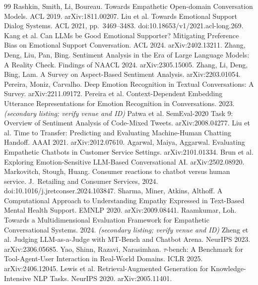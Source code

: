 \documentclass[11pt,a4paper]{article}
\begin{document}
\begin{thebibliography}{99}\small
{} Rashkin, Smith, Li, Boureau. Towards Empathetic Open-domain Conversation Models. ACL 2019. arXiv:1811.00207.
 Liu et al. Towards Emotional Support Dialog Systems. ACL 2021, pp.\ 3469--3483. doi:10.18653/v1/2021.acl-long.269.
 Kang et al. Can LLMs be Good Emotional Supporter? Mitigating Preference Bias on Emotional Support Conversation. ACL 2024. arXiv:2402.13211.
 Zhang, Deng, Liu, Pan, Bing. Sentiment Analysis in the Era of Large Language Models: A Reality Check. Findings of NAACL 2024. arXiv:2305.15005.
 Zhang, Li, Deng, Bing, Lam. A Survey on Aspect-Based Sentiment Analysis. arXiv:2203.01054.
 Pereira, Moniz, Carvalho. Deep Emotion Recognition in Textual Conversations: A Survey. arXiv:2211.09172.
 Pereira et al. Context-Dependent Embedding Utterance Representations for Emotion Recognition in Conversations. 2023. \textit{(secondary listing; verify venue and ID)}
 Patwa et al. SemEval-2020 Task 9: Overview of Sentiment Analysis of Code-Mixed Tweets. arXiv:2008.04277.
 Liu et al. Time to Transfer: Predicting and Evaluating Machine-Human Chatting Handoff. AAAI 2021. arXiv:2012.07610.
 Agarwal, Maiya, Aggarwal. Evaluating Empathetic Chatbots in Customer Service Settings. arXiv:2101.01334.
 Brun et al. Exploring Emotion-Sensitive LLM-Based Conversational AI. arXiv:2502.08920.
 Markovitch, Stough, Huang. Consumer reactions to chatbot versus human service. J.\ Retailing and Consumer Services, 2024. doi:10.1016/j.jretconser.2024.103847.
 Sharma, Miner, Atkins, Althoff. A Computational Approach to Understanding Empathy Expressed in Text-Based Mental Health Support. EMNLP 2020. arXiv:2009.08441.
 Raamkumar, Loh. Towards a Multidimensional Evaluation Framework for Empathetic Conversational Systems. 2024. \textit{(secondary listing; verify venue and ID)}
 Zheng et al. Judging LLM-as-a-Judge with MT-Bench and Chatbot Arena. NeurIPS 2023. arXiv:2306.05685.
 Yao, Shinn, Razavi, Narasimhan. $\tau$-bench: A Benchmark for Tool-Agent-User Interaction in Real-World Domains. ICLR 2025. arXiv:2406.12045.
 Lewis et al. Retrieval-Augmented Generation for Knowledge-Intensive NLP Tasks. NeurIPS 2020. arXiv:2005.11401.

\end{thebibliography}
\end{document}
